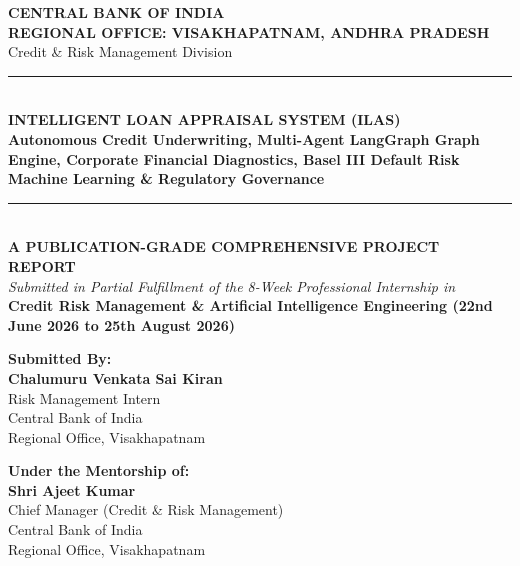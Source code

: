 \documentclass[11pt,a4paper,oneside]{report}
\begin{document}

\begin{titlepage}
\begin{center}
    \vspace*{0.5cm}
    {\Huge\textbf{\color{cboinavy}CENTRAL BANK OF INDIA}}\\[0.3cm]
    {\large\textbf{\color{cboigold}REGIONAL OFFICE: VISAKHAPATNAM, ANDHRA PRADESH}}\\[0.2cm]
    {\small Credit \& Risk Management Division}\\[1.2cm]
    
    \rule{0.85\textwidth}{1.5pt}\\[0.4cm]
    {\LARGE\textbf{\color{cboinavy}INTELLIGENT LOAN APPRAISAL SYSTEM (ILAS)}}\\[0.3cm]
    {\large\textbf{Autonomous Credit Underwriting, Multi-Agent LangGraph Graph Engine, Corporate Financial Diagnostics, Basel III Default Risk Machine Learning \& Regulatory Governance}}\\[0.4cm]
    \rule{0.85\textwidth}{1.5pt}\\[1.2cm]
    
    \textbf{\color{cboigold}A PUBLICATION-GRADE COMPREHENSIVE PROJECT REPORT}\\[0.2cm]
    \textit{Submitted in Partial Fulfillment of the 8-Week Professional Internship in}\\[0.1cm]
    \textbf{Credit Risk Management \& Artificial Intelligence Engineering (22nd June 2026 to 25th August 2026)}\\[1.8cm]
    
    \begin{minipage}{0.48\textwidth}
        \begin{flushleft}
            \textbf{Submitted By:}\\
            \textbf{\color{cboinavy}Chalumuru Venkata Sai Kiran}\\
            Risk Management Intern\\
            Central Bank of India\\
            Regional Office, Visakhapatnam
        \end{flushleft}
    \end{minipage}
    \hfill
    \begin{minipage}{0.48\textwidth}
        \begin{flushright}
            \textbf{Under the Mentorship of:}\\
            \textbf{\color{cboinavy}Shri Ajeet Kumar}\\
            Chief Manager (Credit \& Risk Management)\\
            Central Bank of India\\
            Regional Office, Visakhapatnam
        \end{flushright}
    \end{minipage}
    

\end{center}
\end{titlepage}
\end{document}
